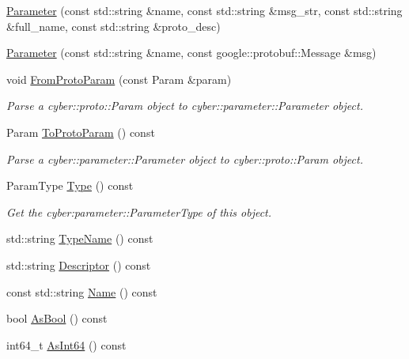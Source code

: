 \begin{DoxyCompactItemize}
\item 
\hyperlink{classapollo_1_1cyber_1_1Parameter_a6c004100b2f5c821dd54f9c643b2da5e}{Parameter} (const std\-::string \&name, const std\-::string \&msg\-\_\-str, const std\-::string \&full\-\_\-name, const std\-::string \&proto\-\_\-desc)
\item 
\hyperlink{classapollo_1_1cyber_1_1Parameter_ad7a3beb3bed6448d31e9143b4a244fe0}{Parameter} (const std\-::string \&name, const google\-::protobuf\-::\-Message \&msg)
\item 
void \hyperlink{classapollo_1_1cyber_1_1Parameter_a3cd699d1884588eacd665cfa2070351f}{From\-Proto\-Param} (const Param \&param)
\begin{DoxyCompactList}\small\item\em Parse a cyber\-::proto\-::\-Param object to cyber\-::parameter\-::\-Parameter object. \end{DoxyCompactList}\item 
Param \hyperlink{classapollo_1_1cyber_1_1Parameter_a3c278e4a712d6dbc0cd1bfd37f6fea24}{To\-Proto\-Param} () const 
\begin{DoxyCompactList}\small\item\em Parse a cyber\-::parameter\-::\-Parameter object to cyber\-::proto\-::\-Param object. \end{DoxyCompactList}\item 
Param\-Type \hyperlink{classapollo_1_1cyber_1_1Parameter_af24b9d74e869e311a49462adefe7b918}{Type} () const 
\begin{DoxyCompactList}\small\item\em Get the cyber\-:parameter\-:\-:Parameter\-Type of this object. \end{DoxyCompactList}\item 
std\-::string \hyperlink{classapollo_1_1cyber_1_1Parameter_a351f1ea21333d16047249f587f937acb}{Type\-Name} () const 
\item 
std\-::string \hyperlink{classapollo_1_1cyber_1_1Parameter_a17f94a44576b1e90cc2f4d59e997be30}{Descriptor} () const 
\item 
const std\-::string \hyperlink{classapollo_1_1cyber_1_1Parameter_a1a586ca2296aca2c8d397fc4ec56a272}{Name} () const 
\item 
bool \hyperlink{classapollo_1_1cyber_1_1Parameter_a5b1801efef34c80376cd49cba51baea5}{As\-Bool} () const 
\item 
int64\-\_\-t \hyperlink{classapollo_1_1cyber_1_1Parameter_ac7b1bdfa2b1ec92990b187e17bfbf24d}{As\-Int64} () const 
\item 

\end{DoxyCompactItemize}
